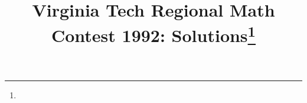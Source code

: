 \documentclass[10pt]{article}
\begin{document}
\title{Virginia Tech Regional Math Contest 1992: Solutions\footnote{\disclaimer}}
\author{\vspace{-2ex}}
\date{\vspace{-5ex}} %
\maketitle

%

%

%

%

%

%

%

%
\end{document}
